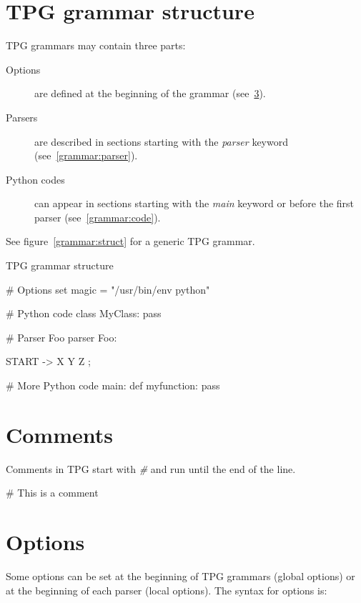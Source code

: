 \section{TPG grammar structure}

TPG grammars may contain three parts:

\begin{description}
	\item [Options]
		are defined at the beginning of the grammar (see~\ref{grammar:options}).
	\item [Parsers]
		are described in sections starting with the \emph{parser} keyword (see~\ref{grammar:parser}).
	\item [Python codes]
		can appear in sections starting with the \emph{main} keyword or before the first parser (see~\ref{grammar:code}).
\end{description}

See figure~\ref{grammar:struct} for a generic TPG grammar.

\begin{code}
\caption{TPG grammar structure}								\label{grammar:struct}
\begin{verbatimtab}[4]
# Options
set magic = "/usr/bin/env python"

# Python code
{{
	class MyClass:
		pass
}}

# Parser Foo
parser Foo:

	START -> X Y Z ;

# More Python code
main:
{{
	def myfunction:
		pass
}}
\end{verbatimtab}
\end{code}

\section{Comments}

Comments in TPG start with \emph{\#} and run until the end of the line.

\begin{verbatimtab}[4]
	# This is a comment
\end{verbatimtab}

\section{Options}											\label{grammar:options}

Some options can be set at the beginning of TPG grammars (global options)
or at the beginning of each parser (local options).
The syntax for options is:

